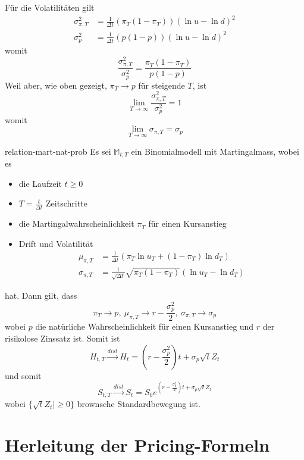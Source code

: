 \documentclass[11pt]{report} %
\begin{document}
Für die Volatilitäten gilt
\begin{align*}
    \sigma_{\pi, T}^2&=\frac{1}{\Delta t}(\pi_T(1-\pi_T))(\ln{u}-\ln{d})^2\\
    \sigma_p^2&=\frac{1}{\Delta t}(p(1-p))(\ln{u}-\ln{d})^2
\end{align*}
womit $$\frac{\sigma_{\pi, T}^2}{\sigma_p^2}=\frac{\pi_T(1-\pi_T)}{p(1-p)}$$
Weil aber, wie oben gezeigt, $\pi_T\rightarrow p$ für steigende $T$, ist
$$\lim_{T\to\infty}\frac{\sigma_{\pi, T}^2}{\sigma_p^2}=1$$
womit $$\lim_{T\to\infty}\sigma_{\pi, T}=\sigma_p$$
\begin{Theorem}{}{relation-mart-nat-prob}
    Es sei $\mathbb{M}_{t, T}$ ein Binomialmodell mit Martingalmass, wobei es
    \begin{itemize}
        \item die Laufzeit $t\geq0$
        \item $T=\frac{t}{\Delta t}$ Zeitschritte
        \item die Martingalwahrscheinlichkeit $\pi_T$ für einen Kursanstieg
        \item Drift und Volatilität \begin{align*}
            \mu_{\pi, T}&=\frac{1}{\Delta t}(\pi_T\ln{u_T}+(1-\pi_T)\ln{d_T})\\
            \sigma_{\pi, T}&=\frac{1}{\sqrt{\Delta t}}\sqrt{\pi_T(1-\pi_T)}(\ln{u_T}-\ln{d_T})
        \end{align*}
    \end{itemize}
    hat. Dann gilt, dass
    $$\pi_T\rightarrow p,\  \mu_{\pi, T}\rightarrow r-\frac{\sigma_p^2}{2},\  \sigma_{\pi, T}\rightarrow\sigma_p$$ wobei $p$ die natürliche Wahrscheinlichkeit für einen Kursanstieg und $r$ der risikolose Zinssatz ist. Somit ist $$H_{t, T}\xrightarrow{dist}H_t=\left(r-\frac{\sigma_p^2}{2}\right)t+\sigma_p\sqrt{t}Z_t$$ und somit $$S_{t, T}\xrightarrow{dist}S_t=S_0e^{\left(r-\frac{\sigma_p^2}{2}\right)t+\sigma_p\sqrt{t}Z_t}$$ wobei $\{\sqrt{t}Z_t|\geq0\}$ brownsche Standardbewegung ist. 
\end{Theorem}
\section{Herleitung der Pricing-Formeln}
\end{document}

